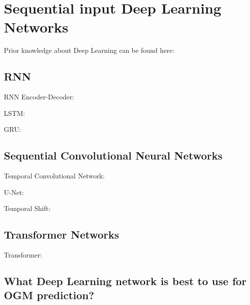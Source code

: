 \section{Sequential input Deep Learning Networks} \label{sec:seqDLnets}

Prior knowledge about Deep Learning can be found here: 

\subsection{RNN}

RNN Encoder-Decoder: \cite{cho2014learning}

LSTM: \cite{hochreiter1997long}

GRU: \cite{cho2014properties}


\subsection{Sequential Convolutional Neural Networks}

Temporal Convolutional Network: \cite{lea2017temporal}

U-Net: \cite{ronneberger2015u}

Temporal Shift: \cite{lin2019tsm}	


\subsection{Transformer Networks}

Transformer: \cite{vaswani2017attention}


\subsection{What Deep Learning network is best to use for OGM prediction?}